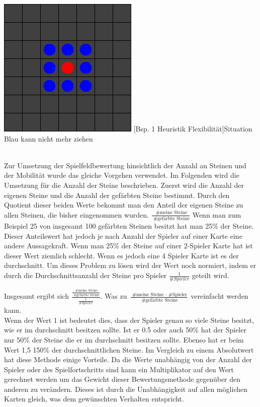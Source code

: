 \documentclass[12pt,a4paper,bibliography=totocnumbered,listof=totocnumbered]{article}
\begin{document}
\vspace{1em}
\begin{minipage}{\linewidth}
	\centering
	\includegraphics[width=0.3\linewidth]{pics/heuristics_flexibility_simple.png}
	[Bsp. 1 Heuristik Flexibilität]{Situation Blau kann nicht mehr ziehen}
	\label{fig:example_heuristics_flexibility_simple}
\end{minipage}
\\


Zur Umsetzung der Spielfeldbewertung hinsichtlich der Anzahl an Steinen und der Mobilität wurde das gleiche Vorgehen verwendet. Im Folgenden wird die Umsetzung für die Anzahl der Steine beschrieben.
Zuerst wird die Anzahl der eigenen Steine und die Anzahl der gefärbten Steine bestimmt. Durch den Quotient dieser beiden Werte bekommt man den Anteil der eigenen Steine zu allen Steinen, die bisher eingenommen wurden. $\frac{\text{ \# meine Steine}}{\text{ \# gefärbte Steine}} $ Wenn man zum Beispiel 25 von insgesamt 100 gefärbten Steinen besitzt hat man 25\% der Steine. Dieser Anteilswert hat jedoch je nach Anzahl der Spieler auf einer Karte eine andere Aussagekraft. Wenn man 25\% der Steine auf einer 2-Spieler Karte hat ist dieser Wert ziemlich schlecht. Wenn es jedoch eine 4 Spieler Karte ist es der durchschnitt. Um dieses Problem zu lösen wird der Wert noch normiert, indem er durch die Durchschnittsanzahl der Steine pro Spieler $ \frac{1}{ \# Spieler} $ geteilt wird. 

Insgesamt ergibt sich
\( \frac{ \frac{\text{ \# meine Steine}}{\text{ \# gefärbte Steine}} }{ \frac{1}{ \# Spieler} } \).
Was zu
\( \frac{ \text{ \# meine Steine } \cdot \text{ \# Spieler} }{ \text{ \# gefärbte Steine} } \) 
vereinfacht werden kann.\\
Wenn der Wert 1 ist bedeutet dies, dass der Spieler genau so viele Steine besitzt, wie er im durchschnitt besitzen sollte. Ist er 0.5 oder auch 50\% hat der Spieler nur 50\% der Steine die er im durchschnitt besitzen sollte. Ebenso hat er beim Wert 1,5 150\% der durchschnittlichen Steine.
Im Vergleich zu einem Absolutwert hat diese Methode einige Vorteile. Da die Werte unabhängig von der Anzahl der Spieler oder des Spielfortschritts sind  kann ein Multiplikator auf den Wert gerechnet werden um das Gewicht dieser Bewertungsmethode gegenüber den anderen zu verändern. Dieses ist durch die Unabhängigkeit auf allen möglichen Karten gleich, was dem gewünschten Verhalten entspricht.
\end{document}
